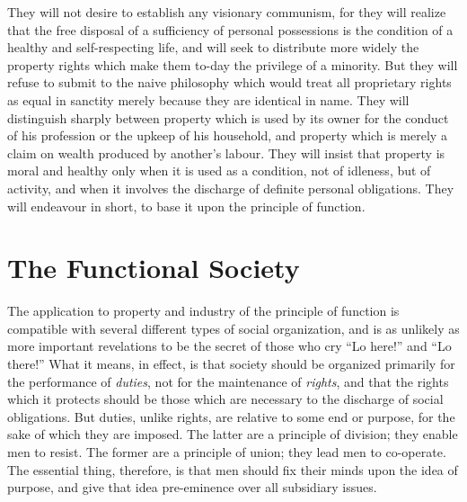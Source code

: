 \documentclass{book}
\begin{document}
They will not desire to establish any visionary communism, for they will realize that the free disposal of a sufficiency of personal possessions is the condition of a healthy and self-respecting life, and will seek to distribute more widely the property rights which make them to-day the privilege of a minority. But they will refuse to submit to the naive philosophy which would treat all proprietary rights as equal in sanctity merely because they are identical in name. They will distinguish sharply between property which is used by its owner for the conduct of his profession or the upkeep of his household, and property which is merely a claim on wealth produced by another’s labour. They will insist that property is moral and healthy only when it is used as a condition, not of idleness, but of activity, and when it involves the discharge of definite personal obligations. They will endeavour in short, to base it upon the principle of function.

\chapter{The Functional Society}
\label{chapter-5}
The application to property and industry of the principle of function is compatible with several different types of social organization, and is as unlikely as more important revelations to be the secret of those who cry “Lo here!” and “Lo there!” What it means, in effect, is that society should be organized primarily for the performance of \emph{duties}, not for the maintenance of \emph{rights}, and that the rights which it protects should be those which are necessary to the discharge of social obligations. But duties, unlike rights, are relative to some end or purpose, for the sake of which they are imposed. The latter are a principle of division; they enable men to resist. The former are a principle of union; they lead men to co-operate. The essential thing, therefore, is that men should fix their minds upon the idea of purpose, and give that idea pre-eminence over all subsidiary issues.
\end{document}
